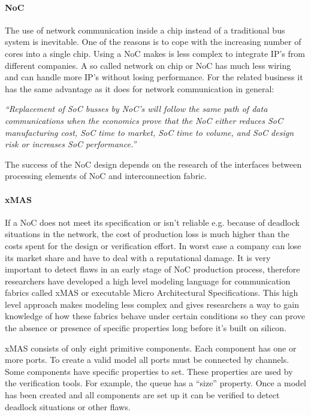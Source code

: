 \paragraph{NoC}

The use of network communication inside a chip instead of a traditional bus
system is inevitable. One of the reasons is to cope with the increasing number
of cores into a single chip. Using a NoC makes is less complex to integrate IP's from
different companies. A so called network on chip or NoC has much less wiring
\cite{NoC-busses} and can handle more IP's without losing performance. For the
related business it has the same advantage as it does for network communication
in general:

\textit{``Replacement of SoC busses by NoC's will follow the same path of data
communications when the economics prove that the NoC either reduces SoC
manufacturing cost, SoC time to market, SoC time to volume, and SoC design risk
or increases SoC performance.''} \cite{NoC-busses} 

The success of the NoC design depends on the research of the interfaces between
processing elements of NoC and interconnection fabric.

\paragraph{xMAS}

If a NoC does not meet its specification or isn't reliable e.g. because of
deadlock situations in the network, the cost of production loss is much higher
than the costs spent for the design or verification effort. In worst case a
company can lose its market share and have to deal with a reputational damage.
It is very important to detect flaws in an early stage of NoC production
process, therefore researchers have developed a high level modeling language for
communication fabrics called xMAS or executable Micro Architectural
Specifications. This high level approach makes modeling less complex and gives
researchers a way to gain knowledge of how these fabrics behave under certain
conditions so they can prove the absence or presence of specific properties long
before it's built on silicon.

xMAS consists of only eight primitive components. Each component has one or more
ports. To create a valid model all ports must be connected by channels. Some
components have specific properties to set. These properties are used by the
verification tools. For example, the queue has a ``size'' property. Once a model
has been created and all components are set up it can be verified to detect
deadlock situations or other flaws.


